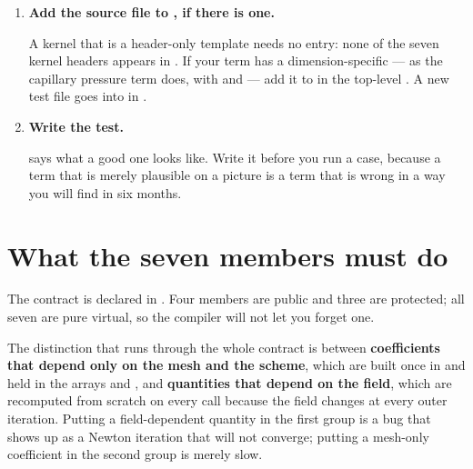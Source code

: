 \begin{enumerate}
\item \textbf{Add the source file to , if there is one.}

A kernel that is a header-only template needs no entry: none of the seven
kernel headers appears in . If your term has a
dimension-specific  --- as the capillary pressure term does, with
 and  --- add it to
 in the top-level . A new test file
goes into  in .

\item \textbf{Write the test.}

 says what a good one looks like. Write it before
you run a case, because a term that is merely plausible on a picture is a term
that is wrong in a way you will find in six months.

\end{enumerate}

\section{What the seven members must do}
\label{sec:extending:contract}

The contract is declared in
. Four members are
public and three are protected; all seven are pure virtual, so the compiler
will not let you forget one.

The distinction that runs through the whole contract is between
\textbf{coefficients that depend only on the mesh and the scheme}, which are
built once in  and held in the arrays  and
, and \textbf{quantities that depend on the field}, which are
recomputed from scratch on every call because the field changes at every outer
iteration. Putting a field-dependent quantity in the first group is a bug that
shows up as a Newton iteration that will not converge; putting a mesh-only
coefficient in the second group is merely slow.

